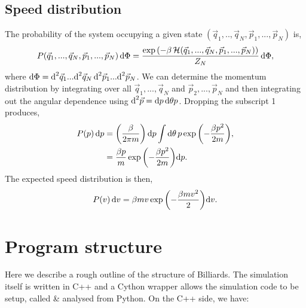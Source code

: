 \documentclass{article}
\newcommand{\diff}{\textnormal{d}}
\begin{document}
\subsection{Speed distribution}
The probability of the system occupying a given state $(\vec{q}_1, .., \vec{q}_N, \vec{p}_1, ..., \vec{p}_N)$ is,
\begin{equation}
    P(\vec{q}_1, ..., \vec{q}_N, \vec{p}_1, ..., \vec{p}_N) \, \diff \Phi
    =
    \frac{\exp{\left(
        - \beta \, \mathcal{H}(\vec{q}_1,..., \vec{q}_N, \vec{p}_1, ..., \vec{p}_N)
    \right)}}{Z_N} \,
    \diff \Phi,
\end{equation}
where $\diff \Phi =\diff^2 \vec{q}_1 ... \diff^2 \vec{q}_N \, \diff^2 \vec{p}_1 ... \diff^2 \vec{p}_N$. We can determine the momentum distribution by integrating over all $\vec{q}_1,..., \vec{q}_N$ and $\vec{p}_2, ..., \vec{p}_N$ and then integrating out the angular dependence using $\diff^2 \vec{p} = \diff p \, \diff \theta p$. Dropping the subscript 1 produces,
\begin{align}
    P(p) \, \diff p
    &=
    \left(
        \frac{\beta}{2 \pi m}
    \right) \diff p
    \int \diff \theta \,
    p
    \exp{\left( -\frac{\beta p^2}{2m} \right)}, \\
    &=
    \frac{\beta p}{m}
    \exp{\left( -\frac{\beta p^2}{2m} \right)} \diff p.
\end{align}
The expected speed distribution is then,
\begin{equation}
    P(v) \, \diff v
    =
    \beta m v \exp{\left( -\frac{\beta m v^2}{2} \right)} \diff v.
\end{equation}

\section{Program structure}
Here we describe a rough outline of the structure of Billiards. The simulation itself is written in C++ and a Cython wrapper allows the simulation code to be setup, called \& analysed from Python. On the C++ side, we have:
\end{document}
